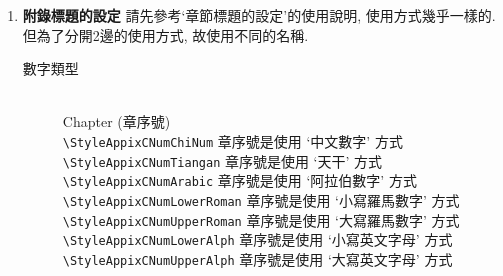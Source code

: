 \begin{enumerate}
{\begin{description}
     預設的格式:\\
     Chapter: Chapter 1
     Section: 1.1\\
     SubSection: 1.1.1\\
     SubSubSection: (空白, 只有題目)

    如果 `章' 要由文字改使用為:\verb|'Chapter 1' -> '第 1 章'|\\
    則使用\verb|\ChapterTitleNumFormat{第 \StyleCNumUpperAlph 章}|

     如果 `章' 要由數字改使用為:\verb|'1' -> '-A-'|\\
     則使用\verb|\ChapterTitleNumFormat{Chapter -\StyleCNumUpperAlph-}|
     
     如果 `節' 要由數字改使用為:\verb|'1.2' -> '一 -乙-'|\\
     則使用\verb|\SectionTitleNumFormat{\StyleCNumChiNum -\StyleCNumTiangan-}|
     
     如果 `節' 不想看到 `章' 的數字:\verb|'1.2' -> '2'|\\
     則使用\verb|\SectionTitleNumFormat{\StyleSNumChiNum}|\\
     直接不提供 `章' 的數字在格式中則可

    \end{description}
  } %

  \item
  {
    \textbf{附錄標題的設定}
    請先參考`章節標題的設定'的使用說明, 使用方式幾乎一樣的.\\
    但為了分開2邊的使用方式, 故使用不同的名稱.

    \begin{description}

    \item [數字類型]\hfill\\
     Chapter (章序號)\\
        \verb|\StyleAppixCNumChiNum| 章序號是使用 `中文數字' 方式\\
        \verb|\StyleAppixCNumTiangan| 章序號是使用 `天干' 方式\\
        \verb|\StyleAppixCNumArabic| 章序號是使用 `阿拉伯數字' 方式\\
        \verb|\StyleAppixCNumLowerRoman| 章序號是使用 `小寫羅馬數字' 方式\\
        \verb|\StyleAppixCNumUpperRoman| 章序號是使用 `大寫羅馬數字' 方式\\
        \verb|\StyleAppixCNumLowerAlph| 章序號是使用 `小寫英文字母' 方式\\
        \verb|\StyleAppixCNumUpperAlph| 章序號是使用 `大寫英文字母' 方式


\end{description}}
\end{enumerate}
